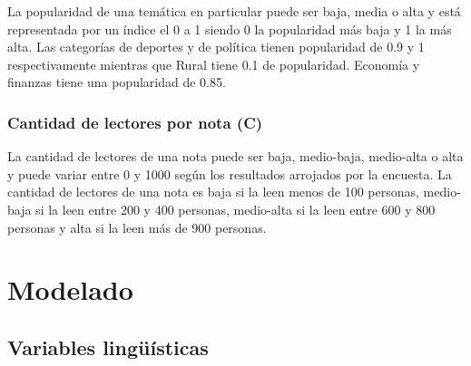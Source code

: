 \documentclass{article}
\begin{document}
La popularidad de una temática en particular puede ser baja, media o alta y está representada por un índice el 0 a 1 siendo 0 la popularidad más baja y 1 la más alta. Las categorías de deportes y de política tienen popularidad de 0.9 y 1 respectivamente mientras que Rural tiene 0.1 de popularidad. Economía y finanzas tiene una popularidad de 0.85.

\subsubsection*{Cantidad de lectores por nota (C)}

La cantidad de lectores de una nota puede ser baja, medio-baja, medio-alta o alta y puede variar entre 0 y 1000 según los resultados arrojados por la encuesta. La cantidad de lectores de una nota es baja si la leen menos de 100 personas, medio-baja si la leen entre 200 y 400 personas, medio-alta si la leen entre 600 y 800 personas y alta si la leen más de 900 personas.
\fi

\section{Modelado}

\subsection{Variables lingüísticas}
\end{document}
